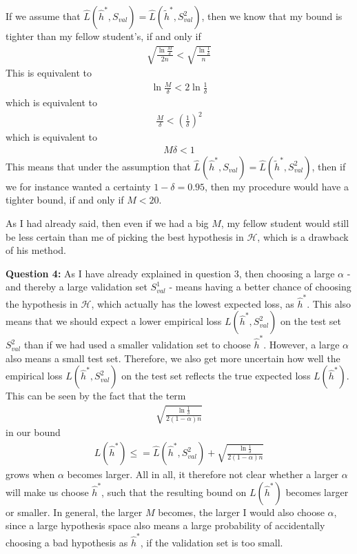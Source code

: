 If we assume that $\hat{L}(\hat{h}^*,S_{val}) = \hat{L}(\tilde{h}^*,S_{val}^2)$, then we know that my bound is tighter than my fellow student's, if and only if
\begin{align}
\sqrt{\frac{\ln \frac{M}{\delta}}{2n}} < \sqrt{\frac{ \ln \frac{1}{\delta}}{n}} 
\end{align}
This is equivalent to
\begin{align}
\ln \frac{M}{\delta} < 2 \ln \frac{1}{\delta}
\end{align}
which is equivalent to
\begin{align}
\frac{M}{\delta} < \left( \frac{1}{\delta} \right)^2
\end{align}
which is equivalent to
\begin{align}
M \delta < 1
\end{align}
This means that under the assumption that $\hat{L}(\hat{h}^*,S_{val}) = \hat{L}(\tilde{h}^*,S_{val}^2)$, then if we for instance wanted a certainty $1-\delta = 0.95$, then my procedure would have a tighter bound, if and only if $M < 20$. 

As I had already said, then even if we had a big $M$, my fellow student would still be less certain than me of picking the best hypothesis in $\mathcal{H}$, which is a drawback of his method.

\textbf{Question 4:} As I have already explained in question 3, then choosing a large $\alpha$ - and thereby a large validation set $S_{val}^1$ - means having a better chance of choosing the hypothesis in $\mathcal{H}$, which actually has the lowest expected loss, as $\hat{h}^*$. This also means that we should expect a lower empirical loss $L(\hat{h}^*,S_{val}^2)$ on the test set $S_{val}^2$ than if we had used a smaller validation set to choose $\hat{h}^*$. However, a large $\alpha$ also means a small test set. Therefore, we also get more uncertain how well the empirical loss $L(\hat{h}^*,S_{val}^2)$ on the test set reflects the true expected loss $L(\hat{h}^*)$. This can be seen by the fact that the term
\begin{align}
\sqrt{\frac{ \ln \frac{1}{\delta}}{2(1-\alpha)n}}
\end{align}
in our bound
\begin{align}
L(\hat{h}^*) \leq = \hat{L}(\hat{h}^*, S_{val}^2) + \sqrt{\frac{ \ln \frac{1}{\delta}}{2(1-\alpha)n}}
\end{align}
grows when $\alpha$ becomes larger. All in all, it therefore not clear whether a larger $\alpha$ will make us choose $\hat{h}^*$, such that the resulting bound on $L(\hat{h}^*)$ becomes larger or smaller. In general, the larger $M$ becomes, the larger I would also choose $\alpha$, since a large hypothesis space also means a large probability of accidentally choosing a bad hypothesis as $\hat{h}^*$, if the validation set is too small.